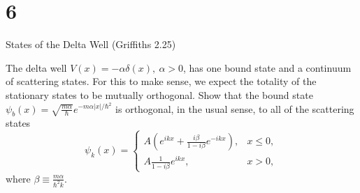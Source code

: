 \documentclass{article}
\begin{document}
\hfil

\section*{6}
\begin{ques}\label{q6}
States of the Delta Well (Griffiths 2.25)

The delta well $V(x) = -\alpha \delta(x), \ \alpha > 0$, has one bound state and a continuum of scattering states. For this to make sense, we expect the totality of the stationary states to be mutually orthogonal. Show that the bound state
$\psi_b(x) = \sqrt{\frac{m \alpha}{\hbar}} e^{-m \alpha |x| / \hbar^2}$
is orthogonal, in the usual sense, to all of the scattering states
\[
\psi_k(x) =
\begin{cases}
A \left( e^{i k x} + \frac{i \beta}{1 - i \beta} e^{-i k x} \right), & x \le 0, \\
A \frac{1}{1 - i \beta} e^{i k x}, & x > 0,
\end{cases}
\]
where $\beta \equiv \frac{m \alpha}{\hbar^2 k}$.
\end{ques}
\end{document}
